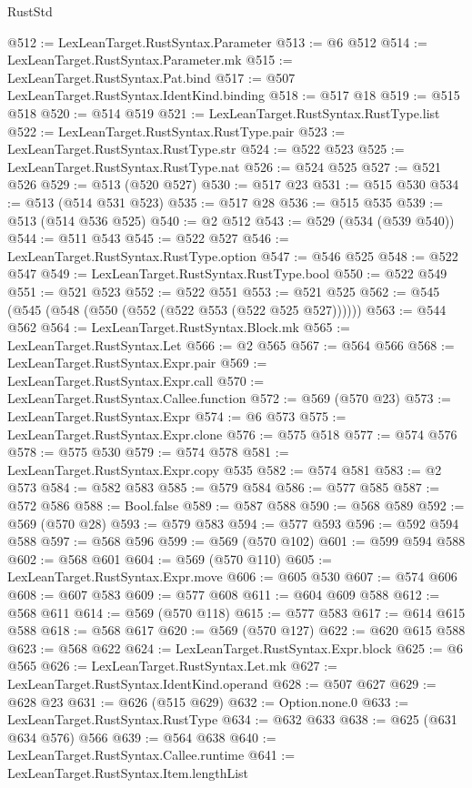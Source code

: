 \begin{lexlean}{RustStd}
\begin{coremodule}
@512 := LexLeanTarget.RustSyntax.Parameter
@513 := @6 @512
@514 := LexLeanTarget.RustSyntax.Parameter.mk
@515 := LexLeanTarget.RustSyntax.Pat.bind
@517 := @507 LexLeanTarget.RustSyntax.IdentKind.binding
@518 := @517 @18
@519 := @515 @518
@520 := @514 @519
@521 := LexLeanTarget.RustSyntax.RustType.list
@522 := LexLeanTarget.RustSyntax.RustType.pair
@523 := LexLeanTarget.RustSyntax.RustType.str
@524 := @522 @523
@525 := LexLeanTarget.RustSyntax.RustType.nat
@526 := @524 @525
@527 := @521 @526
@529 := @513 (@520 @527)
@530 := @517 @23
@531 := @515 @530
@534 := @513 (@514 @531 @523)
@535 := @517 @28
@536 := @515 @535
@539 := @513 (@514 @536 @525)
@540 := @2 @512
@543 := @529 (@534 (@539 @540))
@544 := @511 @543
@545 := @522 @527
@546 := LexLeanTarget.RustSyntax.RustType.option
@547 := @546 @525
@548 := @522 @547
@549 := LexLeanTarget.RustSyntax.RustType.bool
@550 := @522 @549
@551 := @521 @523
@552 := @522 @551
@553 := @521 @525
@562 := @545 (@545 (@548 (@550 (@552 (@522 @553 (@522 @525 @527))))))
@563 := @544 @562
@564 := LexLeanTarget.RustSyntax.Block.mk
@565 := LexLeanTarget.RustSyntax.Let
@566 := @2 @565
@567 := @564 @566
@568 := LexLeanTarget.RustSyntax.Expr.pair
@569 := LexLeanTarget.RustSyntax.Expr.call
@570 := LexLeanTarget.RustSyntax.Callee.function
@572 := @569 (@570 @23)
@573 := LexLeanTarget.RustSyntax.Expr
@574 := @6 @573
@575 := LexLeanTarget.RustSyntax.Expr.clone
@576 := @575 @518
@577 := @574 @576
@578 := @575 @530
@579 := @574 @578
@581 := LexLeanTarget.RustSyntax.Expr.copy @535
@582 := @574 @581
@583 := @2 @573
@584 := @582 @583
@585 := @579 @584
@586 := @577 @585
@587 := @572 @586
@588 := Bool.false
@589 := @587 @588
@590 := @568 @589
@592 := @569 (@570 @28)
@593 := @579 @583
@594 := @577 @593
@596 := @592 @594 @588
@597 := @568 @596
@599 := @569 (@570 @102)
@601 := @599 @594 @588
@602 := @568 @601
@604 := @569 (@570 @110)
@605 := LexLeanTarget.RustSyntax.Expr.move
@606 := @605 @530
@607 := @574 @606
@608 := @607 @583
@609 := @577 @608
@611 := @604 @609 @588
@612 := @568 @611
@614 := @569 (@570 @118)
@615 := @577 @583
@617 := @614 @615 @588
@618 := @568 @617
@620 := @569 (@570 @127)
@622 := @620 @615 @588
@623 := @568 @622
@624 := LexLeanTarget.RustSyntax.Expr.block
@625 := @6 @565
@626 := LexLeanTarget.RustSyntax.Let.mk
@627 := LexLeanTarget.RustSyntax.IdentKind.operand
@628 := @507 @627
@629 := @628 @23
@631 := @626 (@515 @629)
@632 := Option.none.{0}
@633 := LexLeanTarget.RustSyntax.RustType
@634 := @632 @633
@638 := @625 (@631 @634 @576) @566
@639 := @564 @638
@640 := LexLeanTarget.RustSyntax.Callee.runtime
@641 := LexLeanTarget.RustSyntax.Item.lengthList

\end{coremodule}
\end{lexlean}
